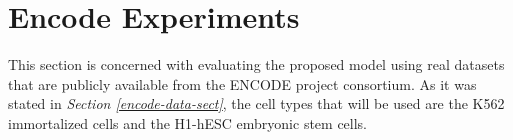 \section{Encode Experiments} \label{meth-encode-experiments-sect}
This section is concerned with evaluating the proposed model using real datasets that are publicly available from the ENCODE project consortium. As it was stated in \emph{Section \ref{encode-data-sect}}, the cell types that will be used are the K562 immortalized cells and the H1-hESC embryonic stem cells. 



